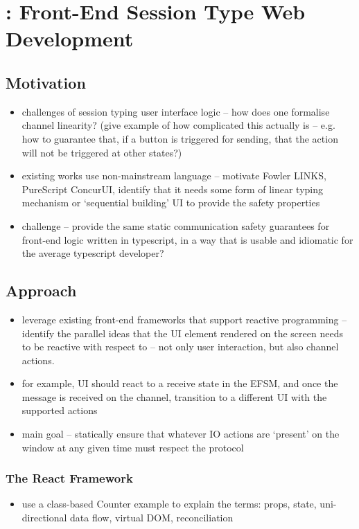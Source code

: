 \chapter{: Front-End Session Type Web Development}
\label{chap:react}

\section{Motivation}
\begin{itemize}
\item challenges of session typing user interface logic -- how does one formalise channel linearity? (give example of how complicated this actually is -- e.g. how to guarantee that, if a button is triggered for sending, that the action will not be triggered at other states?)
\item existing works use non-mainstream language -- motivate Fowler LINKS, PureScript ConcurUI, identify that it needs some form of linear typing mechanism or `sequential building' UI to provide the safety properties
\item challenge -- provide the same static communication safety guarantees for front-end logic written in typescript, in a way that is usable and idiomatic for the average typescript developer?
\end{itemize}

\section{Approach}
\begin{itemize}
\item leverage existing front-end frameworks that support reactive programming -- identify the parallel ideas that the UI element rendered on the screen needs to be reactive with respect to -- not only user interaction, but also channel actions.
\item for example, UI should react to a receive state in the EFSM, and once the message is received on the channel, transition to a different UI with the supported actions
\item main goal -- statically ensure that whatever IO actions are `present' on the window at any given time must respect the protocol
\end{itemize}

\subsection{The React Framework}
\begin{itemize}
\item use a class-based Counter example to explain the terms: props, state, uni-directional data flow, virtual DOM, reconciliation
\end{itemize}

